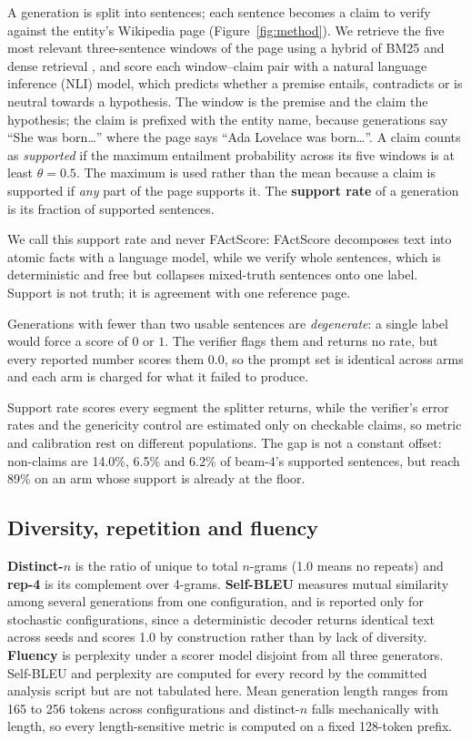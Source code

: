 \documentclass[11pt]{article}
\begin{document}
A generation is split into sentences; each sentence becomes a claim to verify
against the entity's Wikipedia page (Figure~\ref{fig:method}). We retrieve the
five most relevant three-sentence windows of the page using a hybrid of BM25
\citep{robertson2009bm25} and dense retrieval \citep{reimers2019sbert,
song2020mpnet}, and score each window--claim pair with a natural language
inference (NLI) model, which predicts whether a premise entails, contradicts or
is neutral towards a hypothesis. The window is the premise and the claim the
hypothesis; the claim is prefixed with the entity name, because generations say
``She was born\ldots'' where the page says ``Ada Lovelace was born\ldots''. A
claim counts as \emph{supported} if the maximum entailment probability across
its five windows is at least $\theta=0.5$. The maximum is used rather than the
mean because a claim is supported if \emph{any} part of the page supports it.
The \textbf{support rate} of a generation is its fraction of supported
sentences.

We call this support rate and never FActScore: FActScore decomposes text into
atomic facts with a language model, while we verify whole sentences, which is
deterministic and free but collapses mixed-truth sentences onto one label.
Support is not truth; it is agreement with one reference page.

Generations with fewer than two usable sentences are \emph{degenerate}: a single
label would force a score of $0$ or $1$. The verifier flags them and returns no
rate, but every reported number scores them $0.0$, so the prompt set is
identical across arms and each arm is charged for what it failed to produce.

Support rate scores every segment the splitter returns, while the verifier's
error rates and the genericity control are estimated only on checkable claims,
so metric and calibration rest on different populations. The gap is not a
constant offset: non-claims are 14.0\%, 6.5\% and 6.2\% of beam-4's supported
sentences, but reach 89\% on an arm whose support is already at the floor.

\subsection{Diversity, repetition and fluency}

\textbf{Distinct-$n$} is the ratio of unique to total $n$-grams (1.0 means no
repeats) and \textbf{rep-4} is its complement over 4-grams. \textbf{Self-BLEU}
measures mutual similarity among several generations from one configuration,
and is reported only for stochastic configurations, since a deterministic
decoder returns identical text across seeds and scores 1.0 by construction
rather than by lack of diversity. \textbf{Fluency} is perplexity under a scorer
model disjoint from all three generators. Self-BLEU and perplexity are computed
for every record by the committed analysis script but are not tabulated here.
Mean generation length ranges from 165 to 256 tokens across configurations and
distinct-$n$ falls mechanically with length, so every length-sensitive metric
is computed on a fixed 128-token prefix.
\end{document}
